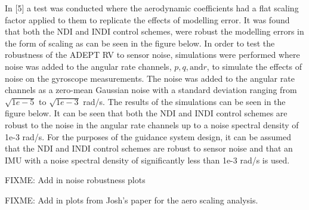 \documentclass[12pt]{article}
\numberwithin{equation}{section}
\numberwithin{figure}{section}
\numberwithin{table}{section}
\begin{document}
In [5] a test was conducted where the aerodynamic coefficients had a flat scaling factor applied to them to replicate the effects of modelling error. It was found that both the NDI and INDI control schemes, were robust the modelling errors in the form of scaling as can be seen in the figure below. In order to test the robustness of the ADEPT RV to sensor noise, simulations were performed where noise was added to the angular rate channels, $p, q, \text{and} r$, to simulate the effects of noise on the gyroscope measurements. The noise was added to the angular rate channels as a zero-mean Gaussian noise with a standard deviation ranging from $ \sqrt{1e-5}$ to $\sqrt{1e-3}$ rad/s. The results of the simulations can be seen in the figure below. It can be seen that both the NDI and INDI control schemes are robust to the noise in the angular rate channels up to a noise spectral density of 1e-3 rad/s. For the purposes of the guidance system design, it can be assumed that the NDI and INDI control schemes are robust to sensor noise and that an IMU with a noise spectral density of significantly less than 1e-3 rad/s is used.

FIXME: Add in noise robustness plots

FIXME: Add in plots from Josh's paper for the aero scaling analysis.
\nocite{*}

\end{document}
